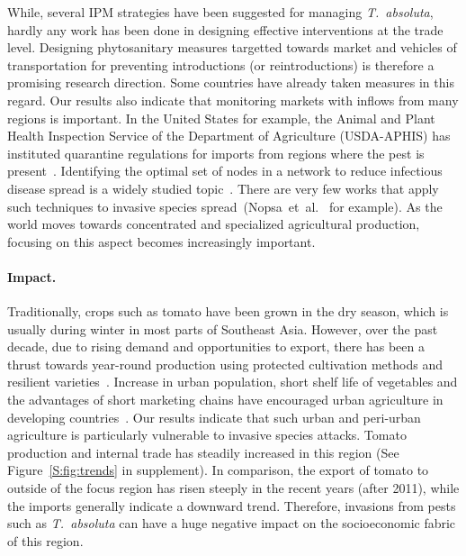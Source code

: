 \documentclass[11pt]{article}
\newcommand{\tuta}{\emph{T.~absoluta}}
\theoremstyle{definition}
\begin{document}
While, several IPM strategies have been suggested for managing \tuta{},
hardly any work has been done in designing effective interventions at the
trade level. Designing phytosanitary measures targetted towards market and
vehicles of transportation for preventing introductions (or
reintroductions) is therefore a promising research direction. Some
countries have already taken measures in this regard. Our results also
indicate that monitoring markets with inflows from many regions is
important. In the United States for example, the Animal and Plant Health
Inspection Service of the Department of Agriculture (USDA-APHIS) has
instituted quarantine regulations for imports from regions where the pest
is present~\cite{USDA2012}. Identifying the optimal set of nodes in a
network to reduce infectious disease spread is a widely studied
topic~\cite{madar2004immunization}. There are very few works that apply
such techniques to invasive species
spread~(Nopsa~et~al.~\cite{nopsa2015ecological} for example). As the world
moves towards concentrated and specialized agricultural production,
focusing on this aspect becomes increasingly important.

\paragraph{Impact.} Traditionally, crops such as tomato have been grown in
the dry season, which is usually during winter in most parts of Southeast
Asia. However, over the past decade, due to rising demand and opportunities
to export, there has been a thrust towards year-round production using
protected cultivation methods and resilient varieties~\cite{ali2001}.
Increase in urban population, short shelf life of vegetables and the
advantages of short marketing chains have encouraged urban agriculture in
developing countries~\cite{moustier2015urban}. Our results indicate that
such urban and peri-urban agriculture is particularly vulnerable to invasive
species attacks. Tomato production and internal trade has steadily
increased in this region (See Figure~\ref{S:fig:trends} in supplement). In
comparison, the export of tomato to outside of the focus region has risen
steeply in the recent years (after 2011), while the imports generally
indicate a downward trend.  Therefore, invasions from pests such as \tuta{}
can have a huge negative impact on the socioeconomic fabric of this region.
\end{document}
